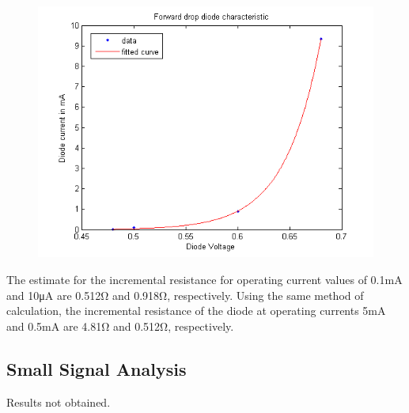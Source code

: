 \documentclass{article}
\begin{document}
\begin{figure}[H]
\centering
\includegraphics[scale=.5]{pic1}
\end{figure}

The estimate for the incremental resistance for operating current values of 0.1\si{\milli\ampere} and 10\si{\micro\ampere} are 0.512\si{\ohm} and 0.918\si{\ohm}, respectively. Using the same method of calculation, the incremental resistance of the diode at operating currents 5\si{\milli\ampere} and 0.5\si{\milli\ampere} are 4.81\si{\ohm} and 0.512\si{\ohm}, respectively.


\subsection{Small Signal Analysis}
Results not obtained.
\end{document}
